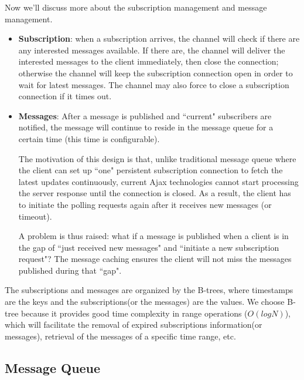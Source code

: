 Now we'll discuss more about the subscription management and message management.
\begin{itemize}
    \item {\bf Subscription}: when a subscription arrives, the channel will
          check if there are any interested messages available. If there are, 
          the channel will deliver the interested messages to the client 
          immediately, then close the connection; otherwise the channel 
          will keep the subscription 
          connection open in order to wait for latest messages. The channel may
          also force to close a subscription connection if it times out. 
    \item {\bf Messages}: After a message is published and 
            ``current" subscribers are notified, the message will continue to 
            reside in the message queue for a certain time (this time is 
            configurable). 
            
            The motivation of this design is that, unlike 
            traditional message queue where the client can set up ``one" 
            persistent subscription connection to fetch the latest updates
            continuously, current Ajax technologies cannot start processing
            the server response until the connection is closed. As a result, 
            the client has to initiate the polling requests again after it
            receives new messages (or timeout).

            A problem is thus raised: what if a message is published when a client 
            is in the gap of ``just received new messages" and ``initiate a new subscription
            request"? The message caching ensures 
            the client will not miss the messages published during that ``gap".
\end{itemize}

The subscriptions and messages are organized by the B-trees\cite{BTree}, where
timestamps are the keys and the subscriptions(or the messages) are the values.
We choose B-tree because it provides good time complexity in range operations
($O(log N)$), which will facilitate the removal of expired subscriptions information(or
messages), retrieval of the messages of a specific time range, etc.

\subsection{Message Queue\\}

